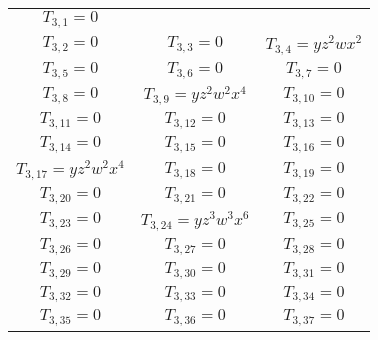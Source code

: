 \begin{longtable}{|c|c|c|}
$T_{3,1}= 0$\\

$T_{3,2}= 0$&

$T_{3,3}= 0$&

$T_{3,4}= yz^2wx^2$\\

$T_{3,5}= 0$&

$T_{3,6}= 0$&

$T_{3,7}= 0$\\

$T_{3,8}= 0$&

$T_{3,9}= yz^2w^2x^4$&

$T_{3,10}= 0$\\

$T_{3,11}= 0$&

$T_{3,12}= 0$&

$T_{3,13}= 0$\\

$T_{3,14}= 0$&

$T_{3,15}= 0$&

$T_{3,16}= 0$\\

$T_{3,17}= yz^2w^2x^4$&

$T_{3,18}= 0$&

$T_{3,19}= 0$\\

$T_{3,20}= 0$&

$T_{3,21}= 0$&

$T_{3,22}= 0$\\

$T_{3,23}= 0$&

$T_{3,24}= yz^3w^3x^6$&

$T_{3,25}= 0$\\

$T_{3,26}= 0$&

$T_{3,27}= 0$&

$T_{3,28}= 0$\\

$T_{3,29}= 0$&

$T_{3,30}= 0$&

$T_{3,31}= 0$\\

$T_{3,32}= 0$&

$T_{3,33}= 0$&

$T_{3,34}= 0$\\

$T_{3,35}= 0$&

$T_{3,36}= 0$&

$T_{3,37}= 0$\\


\end{longtable}
